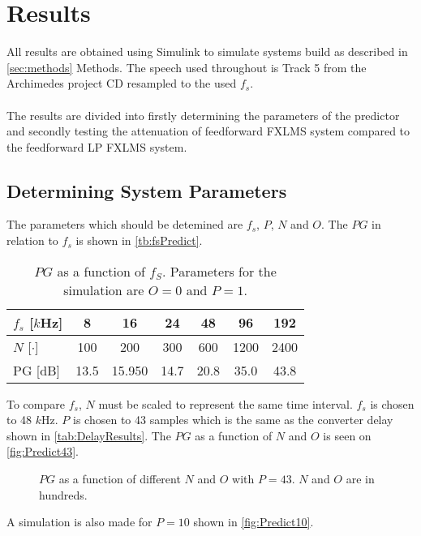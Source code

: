 \section{Results}
All results are obtained using Simulink\textsuperscript{\textregistered} to simulate systems build as described in \autoref{sec:methods} Methods. The speech used throughout is Track 5 from the Archimedes project CD resam{}pled to the used $f_s$.  
\\\\
The results are divided into firstly determining the parameters of the predictor and secondly testing the attenuation of feedforward FXLMS system compared to the feedforward LP FXLMS system.   

\subsection{Determining System Parameters}
The parameters which should be detemined are $f_s$, $P$, $N$ and $O$.         
The $PG$ in relation to $f_s$ is shown in \autoref{tb:fsPredict}.

\begin{table}[H]
\centering
\begin{tabular}{|l|c|c|c|c|c|c|}
\hline
$f_s$ {[}$k$Hz{]} & 8 & 16 & 24 & 48 & 96 & 192 \\ \hline 
$N$ {[}$\cdot${]} & 100 & 200 & 300 & 600 & 1200 & 2400 \\ \hline 
PG {[}dB{]} & 13.5 & 15.950 & 14.7 & 20.8 & 35.0 & 43.8 \\ \hline
\end{tabular}
\caption{$PG$ as a function of $f_S$. Parameters for the simulation are $O=0$ and $P=1$.}
\label{tb:fsPredict}
\end{table}

To compare $f_s$, $N$ must be scaled to represent the same time interval. $f_s$ is chosen to 48 $k$Hz. $P$ is chosen to 43 samples which is the same as the converter delay shown in \autoref{tab:DelayResults}.  
The $PG$ as a function of $N$ and $O$ is seen on \autoref{fig:Predict43}. 

\begin{figure}[H]
	\centering
	
	\caption{$PG$ as a function of different $N$ and $O$ with $P=43$. $N$ and $O$ are in hundreds.}
	\label{fig:Predict43}
\end{figure}

A simulation is also made for $P=10$ shown in \autoref{fig:Predict10}.

